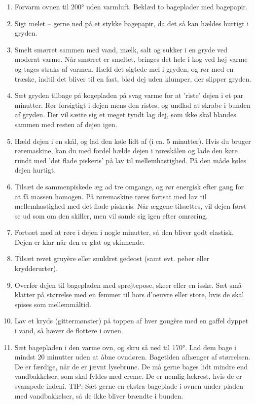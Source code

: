 \documentclass[
  letterpaper,
  DIV=11,
  numbers=noendperiod]{scrreprt}
\begin{document}
\begin{enumerate}
\def\labelenumi{\arabic{enumi}.}
\item
  Forvarm ovnen til 200° uden varmluft. Beklæd to bageplader med
  bagepapir.
\item
  Sigt melet -- gerne ned på et stykke bagepapir, da det så kan hældes
  hurtigt i gryden.
\item
  Smelt smørret sammen med vand, mælk, salt og sukker i en gryde ved
  moderat varme. Når smørret er smeltet, bringes det hele i kog ved høj
  varme og tages straks af varmen. Hæld det sigtede mel i gryden, og rør
  med en træske, indtil det bliver til en fast, blød dej uden klumper,
  der slipper gryden.
\item
  Sæt gryden tilbage på kogepladen på svag varme for at 'riste' dejen i
  et par minutter. Rør forsigtigt i dejen mens den ristes, og undlad at
  skrabe i bunden af gryden. Der vil sætte sig et meget tyndt lag dej,
  som ikke skal blandes sammen med resten af dejen igen.
\item
  Hæld dejen i en skål, og lad den køle lidt af (i ca. 5 minutter). Hvis
  du bruger røremaskine, kan du med fordel hælde dejen i røreskålen og
  lade den køre rundt med 'det flade piskeris' på lav til
  mellemhastighed. På den måde køles dejen hurtigt.
\item
  Tilsæt de sammenpiskede æg ad tre omgange, og rør energisk efter gang
  for at få massen homogen. På røremaskine røres fortsat med lav til
  mellemhastighed med det flade piskeris. Når æggene tilsættes, vil
  dejen først se ud som om den skiller, men vil samle sig igen efter
  omrøring.
\item
  Fortsæt med at røre i dejen i nogle minutter, så den bliver godt
  elastisk. Dejen er klar når den er glat og skinnende.
\item
  Tilsæt revet gruyère eller snuldret gedeost (samt evt. peber eller
  krydderurter).
\item
  Overfør dejen til bagepladen med sprøjtepose, skeer eller en isske.
  Sæt små klatter på størrelse med en femmer til hors d'oeuvre eller
  store, hvis de skal spises som mellemmåltid.
\item
  Lav et kryds (gittermønster) på toppen af hver gougère med en gaffel
  dyppet i vand, så hæver de flottere i ovnen.
\item
  Sæt bagepladen i den varme ovn, og skru så ned til 170°. Lad dem bage
  i mindst 20 minutter uden at åbne ovndøren. Bagetiden afhænger af
  størrelsen. De er færdige, når de er jævnt lysebrune. De må gerne
  bages lidt mindre end vandbakkelser, som skal fyldes med creme. De er
  nemlig lækrest, hvis de er svampede indeni. TIP: Sæt gerne en ekstra
  bageplade i ovnen under pladen med vandbakkelser, så de ikke bliver
  brændte i bunden.
\end{enumerate}
\end{document}
